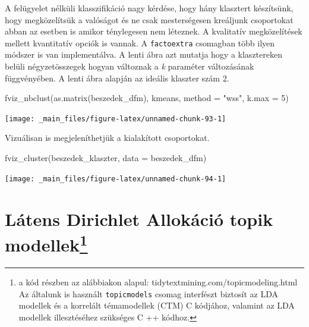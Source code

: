 \documentclass[
]{book}
\newenvironment{Shaded}{\begin{snugshade}}{\end{snugshade}}
\newcommand{\AttributeTok}[1]{\textcolor[rgb]{0.77,0.63,0.00}{#1}}
\newcommand{\DecValTok}[1]{\textcolor[rgb]{0.00,0.00,0.81}{#1}}
\newcommand{\FunctionTok}[1]{\textcolor[rgb]{0.00,0.00,0.00}{#1}}
\newcommand{\NormalTok}[1]{#1}
\newcommand{\StringTok}[1]{\textcolor[rgb]{0.31,0.60,0.02}{#1}}
\begin{document}
A felügyelet nélküli klasszifikáció nagy kérdése, hogy hány klasztert
készítsünk, hogy megközelítsük a valóságot és ne csak mesterségesen
kreáljunk csoportokat abban az esetben is amikor ténylegesen nem
léteznek. A kvalitatív megközelítések mellett kvantitatív opciók is
vannak. A \texttt{factoextra} csomagban több ilyen módszer is van
implementálva. A lenti ábra azt mutatja hogy a klasztereken belüli
négyzetösszegek hogyan változnak a \emph{k} paraméter változásának
függvényében. A lenti ábra alapján az ideális klaszter szám 2.

\begin{Shaded}
\begin{Highlighting}[]

\FunctionTok{fviz\_nbclust}\NormalTok{(}\FunctionTok{as.matrix}\NormalTok{(beszedek\_dfm), kmeans, }\AttributeTok{method =} \StringTok{"wss"}\NormalTok{, }\AttributeTok{k.max =} \DecValTok{5}\NormalTok{)}
\end{Highlighting}
\end{Shaded}

\begin{center}\texttt{[image: \_main\_files/figure-latex/unnamed-chunk-93-1]} \end{center}

Vizuálisan is megjeleníthetjük a kialakított csoportokat.

\begin{Shaded}
\begin{Highlighting}[]
\FunctionTok{fviz\_cluster}\NormalTok{(beszedek\_klaszter, }\AttributeTok{data =}\NormalTok{ beszedek\_dfm)}
\end{Highlighting}
\end{Shaded}

\begin{center}\texttt{[image: \_main\_files/figure-latex/unnamed-chunk-94-1]} \end{center}

\hypertarget{luxe1tens-dirichlet-allokuxe1ciuxf3-topik-modellekklasztering_topicmodellek-1}{%
\section[Látens Dirichlet Allokáció topik
modellek]{\texorpdfstring{Látens Dirichlet Allokáció topik
modellek\footnote{a kód részben az alábbiakon alapul:
  tidytextmining.com/topicmodeling.html Az általunk is használt
  \texttt{topicmodels} csomag interfészt biztosít az LDA modellek és a
  korrelált témamodellek (CTM) C kódjához, valamint az LDA modellek
  illesztéséhez szükséges C ++ kódhoz.}}{Látens Dirichlet Allokáció topik modellek}}\label{luxe1tens-dirichlet-allokuxe1ciuxf3-topik-modellekklasztering_topicmodellek-1}}
\end{document}
